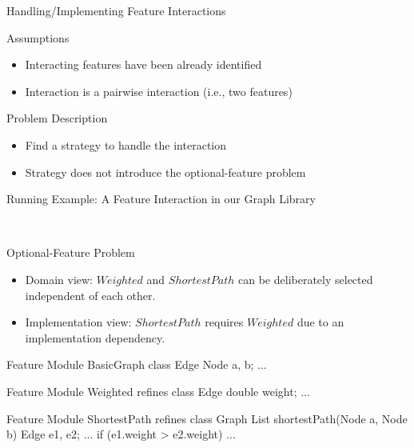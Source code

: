 \begin{frame}{Handling/Implementing Feature Interactions}
	\begin{mycolumns}[animation=none]
		\begin{note}{Assumptions}
			\begin{itemize}
				\item Interacting features have been already identified
				\item Interaction is a pairwise interaction (i.e., two features)
			\end{itemize}
		\end{note}
	\mynextcolumn
		\begin{definition}{Problem Description}
			\begin{itemize}
				\item Find a strategy to handle the interaction 
				\item Strategy does not introduce the optional-feature problem %
			\end{itemize}
		\end{definition}
	\end{mycolumns}
\end{frame}

\begin{frame}[fragile]{Running Example: A Feature Interaction in our Graph Library}
	\begin{mycolumns}[animation=none]
		\centering

		~
		\begin{note}{Optional-Feature Problem}
			\begin{itemize}
				\item Domain view: $Weighted$ and $ShortestPath$ can be deliberately selected independent of each other.
				\item Implementation view: $ShortestPath$ requires $Weighted$ due to an implementation dependency.
			\end{itemize}
		\end{note}
	\mynextcolumn
\begin{codetight}{Feature Module BasicGraph}
class Edge {
	Node a, b; ...
}
\end{codetight}	
\begin{codetight}{Feature Module Weighted}
refines class Edge {
	double weight; ...
}
\end{codetight}	
\begin{codetight}{Feature Module ShortestPath}
refines class Graph {
	List shortestPath(Node a, Node b){
		Edge e1, e2;
		...
		if (e1.weight > e2.weight) 
		... 
	}
}
\end{codetight}	
	\end{mycolumns}
\end{frame}

